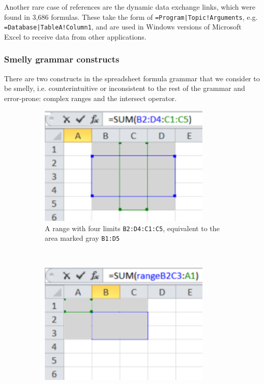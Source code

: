 \documentclass[conference]{IEEEtran}
\begin{document}
Another rare case of references are the dynamic data exchange links, which were found in 3,686 formulas. These take the form of \texttt{=Program|Topic!Arguments}, e.g. \texttt{=Database|TableA!Column1}, and are used in Windows versions of Microsoft Excel to receive  data from other applications.

\subsubsection{Smelly grammar constructs}
There are two constructs in the spreadsheet formula grammar that we consider to be smelly, i.e. counterintuitive or inconsistent to the rest of the grammar and error-prone: complex ranges and the intersect operator.
\begin{figure}
	\centering
	\begin{subfigure}[b]{0.4\textwidth}
		\centering
		\includegraphics[width=0.9\textwidth]{complexRanges}
		\vspace{0.0001mm}
		\caption{A range with four limits \texttt{B2:D4:C1:C5}, equivalent to the area marked gray \texttt{B1:D5}}
		\label{fig:complexA}
	\end{subfigure}
	~ %
	\begin{subfigure}[b]{0.4\textwidth}
		\centering
		\includegraphics[width=0.9\textwidth]{complexNamedRanges}

\end{subfigure}
\end{figure}
\end{document}
